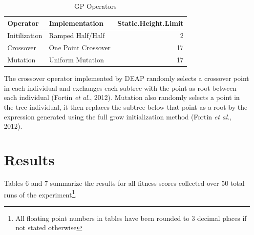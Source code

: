 \documentclass[
  12pt,
]{article}
\begin{document}
\begin{table}[!h]

\caption{\label{tab:unnamed-chunk-5}GP Operators}
\centering
\begin{tabular}[t]{l|l|r}
\hline
\textbf{Operator} & \textbf{Implementation} & \textbf{Static.Height.Limit}\\
\hline
Initilization & Ramped Half/Half & 2\\
\hline
Crossover & One Point Crossover & 17\\
\hline
Mutation & Uniform Mutation & 17\\
\hline
\end{tabular}
\end{table}

The crossover operator implemented by DEAP randomly selects a crossover
point in each individual and exchanges each subtree with the point as
root between each individual (Fortin \emph{et al.}, 2012). Mutation also
randomly selects a point in the tree individual, it then replaces the
subtree below that point as a root by the expression generated using the
full grow initialization method (Fortin \emph{et al.}, 2012).

\hypertarget{results}{%
\section{Results}\label{results}}

Tables 6 and 7 summarize the results for all fitness scores collected
over 50 total runs of the experiment\footnote{All floating point numbers
  in tables have been rounded to 3 decimal places if not stated
  otherwise}.
\end{document}
